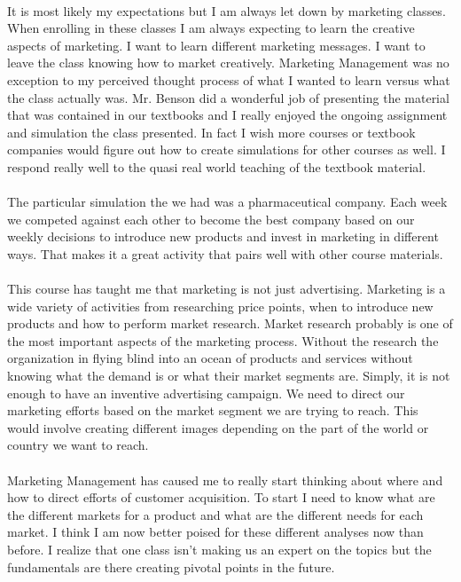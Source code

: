 \documentclass[12pt,titlepage]{article}
\begin{document}
\paragraph {}
It is most likely my expectations but I am always let down by marketing classes. When enrolling in these classes I am always expecting to learn the creative aspects of marketing. I want to learn different marketing messages. I want to leave the class knowing how to market creatively. Marketing Management was no exception to my perceived thought process of what I wanted to learn versus what the class actually was. Mr. Benson did a wonderful job of presenting the material that was contained in our textbooks and I really enjoyed the ongoing assignment and simulation the class presented. In fact I wish more courses or textbook companies would figure out how to create simulations for other courses as well. I respond really well to the quasi real world teaching of the textbook material.
\paragraph {}
The particular simulation the we had was a pharmaceutical company. Each week we competed against each other to become the best company based on our weekly decisions to introduce new products and invest in marketing in different ways. That makes it a great activity that pairs well with other course materials.
\paragraph {}
This course has taught me that marketing is not just advertising. Marketing is a wide variety of activities from researching price points, when to introduce new products and how to perform market research. Market research probably is one of the most important aspects of the marketing process. Without the research the organization in flying blind into an ocean of products and services without knowing what the demand is or what their market segments are. Simply, it is not enough to have an inventive advertising campaign. We need to direct our marketing efforts based on the market segment we are trying to reach. This would involve creating different images depending on the part of the world or country we want to reach.
\paragraph {}
Marketing Management has caused me to really start thinking about where and how to direct efforts of customer acquisition. To start I need to know what are the different markets for a product and what are the different needs for each market. I think I am now better poised for these different analyses now than before. I realize that one class isn't making us an expert on the topics but the fundamentals are there creating pivotal points in the future.
\end{document}
